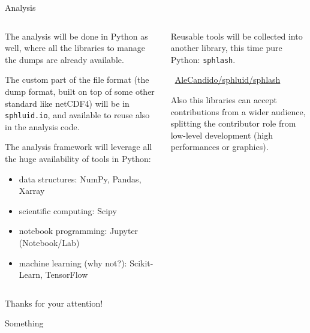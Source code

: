 \documentclass[9pt]{beamer}
\newcommand{\sphlash}{\texttt{sphlash}\xspace}
\begin{document}
\begin{frame}{Analysis}
    \begin{columns}
        \begin{column}{0.5\textwidth}
            The analysis will be done in Python as well, where all the
            libraries to manage the dumps are already available.

            The custom part of the file format (the dump format, built on top
            of some other standard like netCDF4) will be in
            \texttt{sphluid.io}, and available to reuse also in the analysis
            code.
            \vspace*{10pt}

            The analysis framework will leverage all the huge availability of
            tools in Python:
            \begin{itemize}
                \item data structures: NumPy, Pandas, Xarray
                \item scientific computing: Scipy
                \item notebook programming: Jupyter (Notebook/Lab)
                \item machine learning (why not?): Scikit-Learn, TensorFlow
            \end{itemize}
        \end{column}
        \begin{column}{0.5\textwidth}
            Reusable tools will be collected into another library, this time
            pure Python: \sphlash.

            \begin{center}
                ~\href{https://github.com/AleCandido/sphluid/tree/main/sphlash}{AleCandido/sphluid/sphlash}
            \end{center}

            Also this libraries can accept contributions from a wider audience,
            splitting the contributor role from low-level development (high
            performances or graphics).
        \end{column}
    \end{columns}
\end{frame}


\begin{frame}[standout]
    Thanks for your attention!
\end{frame}

\begin{frame}{Something}
    \begin{columns}
        \begin{column}{0.5\textwidth}
        \end{column}
        \begin{column}{0.5\textwidth}
        \end{column}
    \end{columns}
\end{frame}

\end{document}
